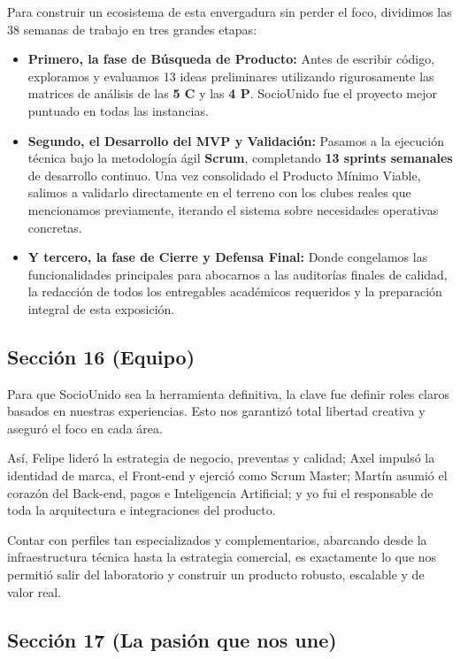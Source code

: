Para construir un ecosistema de esta envergadura sin perder el foco, dividimos las 38 semanas de trabajo en tres grandes etapas:

\begin{itemize}
    \item \textbf{Primero, la fase de Búsqueda de Producto:} Antes de escribir código, exploramos y evaluamos 13 ideas preliminares utilizando rigurosamente las matrices de análisis de las \textbf{5 C} y las \textbf{4 P}. SocioUnido fue el proyecto mejor puntuado en todas las instancias.
    \item \textbf{Segundo, el Desarrollo del MVP y Validación:} Pasamos a la ejecución técnica bajo la metodología ágil \textbf{Scrum}, completando \textbf{13 sprints semanales} de desarrollo continuo. Una vez consolidado el Producto Mínimo Viable, salimos a validarlo directamente en el terreno con los clubes reales que mencionamos previamente, iterando el sistema sobre necesidades operativas concretas.
    \item \textbf{Y tercero, la fase de Cierre y Defensa Final:} Donde congelamos las funcionalidades principales para abocarnos a las auditorías finales de calidad, la redacción de todos los entregables académicos requeridos y la preparación integral de esta exposición.
\end{itemize}

\subsection{Sección 16 (Equipo)}

Para que SocioUnido sea la herramienta definitiva, la clave fue definir roles claros basados en nuestras experiencias. Esto nos garantizó total libertad creativa y aseguró el foco en cada área.

Así, Felipe lideró la estrategia de negocio, preventas y calidad; Axel impulsó la identidad de marca, el Front-end y ejerció como Scrum Master; Martín asumió el corazón del Back-end, pagos e Inteligencia Artificial; y yo fui el responsable de toda la arquitectura e integraciones del producto.

Contar con perfiles tan especializados y complementarios, abarcando desde la infraestructura técnica hasta la estrategia comercial, es exactamente lo que nos permitió salir del laboratorio y construir un producto robusto, escalable y de valor real.

\subsection{Sección 17 (La pasión que nos une)}

